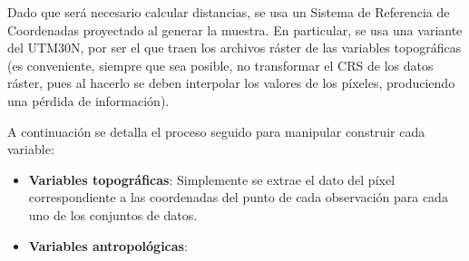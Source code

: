 \documentclass[12pt,a4paper,]{book}
\numberwithin{dummy}{section}
\theoremstyle{ocrenumbox}
\theoremstyle{blacknumex}
\theoremstyle{blacknumbox}
\theoremstyle{ocrenum}
\theoremstyle{ocrenum}
\begin{document}
Dado que será necesario calcular distancias, se usa un Sistema de
Referencia de Coordenadas proyectado al generar la muestra. En
particular, se usa una variante del UTM30N, por ser el que traen los
archivos ráster de las variables topográficas (es conveniente, siempre
que sea posible, no transformar el CRS de los datos ráster, pues al
hacerlo se deben interpolar los valores de los píxeles, produciendo una
pérdida de información).

A continuación se detalla el proceso seguido para manipular construir
cada variable:

\begin{itemize}
\item
  \textbf{Variables topográficas}: Simplemente se extrae el dato del
  píxel correspondiente a las coordenadas del punto de cada observación
  para cada uno de los conjuntos de datos.
\item
  \textbf{Variables antropológicas}:


\end{itemize}
\end{document}
